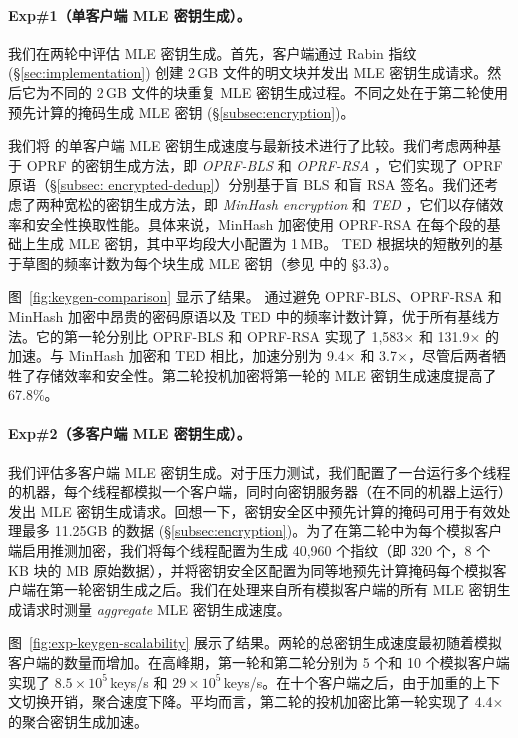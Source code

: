 \paragraph{Exp\#1（单客户端 MLE 密钥生成）。} 我们在两轮中评估 MLE 密钥生成。首先，客户端通过 Rabin 指纹 (\S\ref{sec:implementation}) 创建 2\,GB 文件的明文块并发出 MLE 密钥生成请求。然后它为不同的 2\,GB 文件的块重复 MLE 密钥生成过程。不同之处在于第二轮使用预先计算的掩码生成 MLE 密钥 (\S\ref{subsec:encryption})。

我们将 \sysname 的单客户端 MLE 密钥生成速度与最新技术进行了比较。我们考虑两种基于 OPRF 的密钥生成方法，即 {\em OPRF-BLS} \cite{armknecht15} 和 {\em OPRF-RSA} \cite{bellare13b}，它们实现了 OPRF 原语（\S\ref{subsec: encrypted-dedup}）分别基于盲 BLS 和盲 RSA 签名。我们还考虑了两种宽松的密钥生成方法，即 {\em MinHash encryption} \cite{qin17} 和 {\em TED} \cite{li20b}，它们以存储效率和安全性换取性能。具体来说，MinHash 加密使用 OPRF-RSA 在每个段的基础上生成 MLE 密钥，其中平均段大小配置为 1\,MB。 TED 根据块的短散列的基于草图的频率计数为每个块生成 MLE 密钥（参见 \cite{li20b} 中的 \S3.3）。

图~\ref{fig:keygen-comparison} 显示了结果。 \sysname 通过避免 OPRF-BLS、OPRF-RSA 和 MinHash 加密中昂贵的密码原语以及 TED 中的频率计数计算，优于所有基线方法。它的第一轮分别比 OPRF-BLS 和 OPRF-RSA 实现了 1,583$\times$ 和 131.9$\times$ 的加速。与 MinHash 加密和 TED 相比，加速分别为 9.4$\times$ 和 3.7$\times$，尽管后两者牺牲了存储效率和安全性。第二轮投机加密将第一轮的 MLE 密钥生成速度提高了 67.8\%。



\paragraph{Exp\#2（多客户端 MLE 密钥生成）。} 我们评估多客户端 MLE 密钥生成。对于压力测试，我们配置了一台运行多个线程的机器，每个线程都模拟一个客户端，同时向密钥服务器（在不同的机器上运行）发出 MLE 密钥生成请求。回想一下，密钥安全区中预先计算的掩码可用于有效处理最多 11.25GB 的数据 (\S\ref{subsec:encryption})。为了在第二轮中为每个模拟客户端启用推测加密，我们将每个线程配置为生成 40,960 个指纹（即 320 个，8 个 KB 块的 MB 原始数据），并将密钥安全区配置为同等地预先计算掩码每个模拟客户端在第一轮密钥生成之后。我们在处理来自所有模拟客户端的所有 MLE 密钥生成请求时测量 {\em aggregate} MLE 密钥生成速度。

图~\ref{fig:exp-keygen-scalability} 展示了结果。两轮的总密钥生成速度最初随着模拟客户端的数量而增加。在高峰期，第一轮和第二轮分别为 5 个和 10 个模拟客户端实现了 $8.5\times 10^5$\,keys/s 和 $29\times 10^5$\,keys/s。在十个客户端之后，由于加重的上下文切换开销，聚合速度下降。平均而言，第二轮的投机加密比第一轮实现了 4.4$\times$ 的聚合密钥生成加速。


